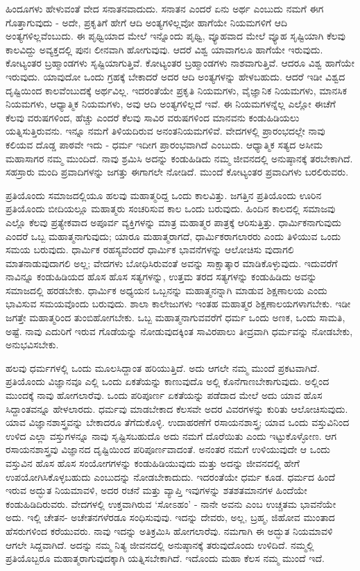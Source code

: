 ಹಿಂದೂಗಳು ಹೇಳುವಂತೆ ವೇದ ಸನಾತನವಾದುದು. ಸನಾತನ ಎಂದರೆ ಏನು ಅರ್ಥ ಎಂಬುದು ನಮಗೆ ಈಗ ಗೊತ್ತಾಗುವುದು - ಅದೇ, ಪ್ರಕೃತಿಗೆ ಹೇಗೆ ಆದಿ ಅಂತ್ಯಗಳಿಲ್ಲವೋ ಹಾಗೆಯೇ ನಿಯಮಗಳಿಗೆ ಆದಿ ಅಂತ್ಯಗಳಿಲ್ಲವೆಂಬುದು. ಈ ಪೃಥ್ವಿಯಾದ ಮೇಲೆ ಇನ್ನೊಂದು ಪೃಥ್ವಿ, ವ್ಯೂಹವಾದ ಮೇಲೆ ವ್ಯೂಹ ಸೃಷ್ಟಿಯಾಗಿ ಕೆಲವು ಕಾಲವಿದ್ದು ಅವ್ಯಕ್ತದಲ್ಲಿ ಪುನಃ ಲೀನವಾಗಿ ಹೋಗುವುವು. ಆದರೆ ವಿಶ್ವ ಯಾವಾಗಲೂ ಹಾಗೆಯೇ ಇರುವುದು. ಕೋಟ್ಯಂತರ ಬ್ರಹ್ಮಾಂಡಗಳು ಸೃಷ್ಟಿಯಾಗುತ್ತಿವೆ. ಕೋಟ್ಯಂತರ ಬ್ರಹ್ಮಾಂಡಗಳು ನಾಶವಾಗುತ್ತಿವೆ. ಆದರೂ ವಿಶ್ವ ಹಾಗೆಯೇ ಇರುವುದು. ಯಾವುದೋ ಒಂದು ಗ್ರಹಕ್ಕೆ ಬೇಕಾದರೆ ಅದರ ಆದಿ ಅಂತ್ಯಗಳನ್ನು ಹೇಳಬಹುದು. ಆದರೆ ಇಡೀ ವಿಶ್ವದ ದೃಷ್ಟಿಯಿಂದ ಕಾಲವೆಂಬುದಕ್ಕೆ ಅರ್ಥವಿಲ್ಲ. ಇದರಂತೆಯೇ ಪ್ರಕೃತಿ ನಿಯಮಗಳು, ವೈಜ್ಞಾನಿಕ ನಿಯಮಗಳು, ಮಾನಸಿಕ ನಿಯಮಗಳು, ಆಧ್ಯಾತ್ಮಿಕ ನಿಯಮಗಳು, ಅವು ಆದಿ ಅಂತ್ಯಗಳಿಲ್ಲದೆ ಇವೆ. ಈ ನಿಯಮಗಳನ್ನೆಲ್ಲ ಎಲ್ಲೋ ಈಚೆಗೆ ಕೆಲವು ವರುಷಗಳಿಂದ, ಹೆಚ್ಚು ಎಂದರೆ ಕೆಲವು ಸಾವಿರ ವರುಷಗಳಿಂದ ಮಾನವನು ಕಂಡುಹಿಡಿಯಲು ಯತ್ನಿಸುತ್ತಿರುವನು. ಇನ್ನೂ ನಮಗೆ ತಿಳಿಯದಿರುವ ಅನಂತನಿಯಮಗಳಿವೆ. ವೇದಗಳಲ್ಲಿ ಪ್ರಾರಂಭದಲ್ಲೇ ನಾವು ಕಲಿಯವ ದೊಡ್ಡ ಪಾಠವೇ ಇದು - ಧರ್ಮ ಇದೀಗ ಪ್ರಾರಂಭವಾಗಿದೆ ಎಂಬುದು. ಆಧ್ಯಾತ್ಮಿಕ ಸತ್ಯದ ಅಸೀಮ ಮಹಾಸಾಗರ ನಮ್ಮ ಮುಂದಿದೆ. ನಾವು ಶ್ರಮಿಸಿ ಅದನ್ನು ಕಂಡುಹಿಡಿದು ನಮ್ಮ ಜೀವನದಲ್ಲಿ ಅನುಷ್ಠಾನಕ್ಕೆ ತರಬೇಕಾಗಿದೆ. ಸಹಸ್ರಾರು ಮಂದಿ ಪ್ರವಾದಿಗಳನ್ನು ಜಗತ್ತು ಈಗಾಗಲೇ ನೋಡಿದೆ. ಮುಂದೆ ಕೋಟ್ಯಂತರ ಪ್ರವಾದಿಗಳು ಬರಲಿರುವರು.

ಪ್ರತಿಯೊಂದು ಸಮಾಜದಲ್ಲಿಯೂ ಹಲವು ಮಹಾತ್ಮರಿದ್ದ ಒಂದು ಕಾಲವಿತ್ತು. ಜಗತ್ತಿನ ಪ್ರತಿಯೊಂದು ಊರಿನ ಪ್ರತಿಯೊಂದು ಬೀದಿಯಲ್ಲೂ ಮಹಾತ್ಮರು ಸಂಚರಿಸುವ ಕಾಲ ಒಂದು ಬರುವುದು. ಹಿಂದಿನ ಕಾಲದಲ್ಲಿ ಸಮಾಜವು ಎಲ್ಲೊ ಕೆಲವು ಪ್ರತ್ಯೇಕವಾದ ಅಪೂರ್ವ ವ್ಯಕ್ತಿಗಳನ್ನು ಮಾತ್ರ ಮಹಾತ್ಮರ ಪಾತ್ರಕ್ಕೆ ಆರಿಸುತ್ತಿತ್ತು. ಧಾರ್ಮಿಕನಾಗುವುದು ಎಂದರೆ ಒಬ್ಬ ಮಹಾತ್ಮನಾಗುವುದು; ಯಾರೂ ಮಹಾತ್ಮರಾಗದೆ, ಧಾರ್ಮಿಕರಾಗಲಾರರು ಎಂದು ತಿಳಿಯುವ ಒಂದು ಸಮಯ ಬರುವುದು. ಧಾರ್ಮಿಕ ರಹಸ್ಯವೆಂದರೆ ಧಾರ್ಮಿಕ ಭಾವನೆಗಳನ್ನು ಆಲೋಚಿಸು ವುದಾಗಲಿ ಮಾತನಾಡುವುದಾಗಲಿ ಅಲ್ಲ; ವೇದಗಳು ಬೋಧಿಸಿರುವಂತೆ ಅವನ್ನು ಸಾಕ್ಷಾತ್ಕಾರ ಮಾಡಿಕೊಳ್ಳುವುದು. ಇದುವರೆಗೆ ನಾವಿನ್ನೂ ಕಂಡುಹಿಡಿಯದ ಹೊಸ ಹೊಸ ಸತ್ಯಗಳನ್ನು, ಉತ್ತಮ ತರದ ಸತ್ಯಗಳನ್ನು ಕಂಡುಹಿಡಿದು ಅವನ್ನು ಸಮಾಜದಲ್ಲಿ ಹರಡಬೇಕು. ಧಾರ್ಮಿಕ ಅಧ್ಯಯನ ಒಬ್ಬನನ್ನು ಮಹಾತ್ಮನನ್ನಾಗಿ ಮಾಡುವ ಶಿಕ್ಷಣಾಲಯ ಎಂದು ಭಾವಿಸುವ ಸಮಯವೊಂದು ಬರುವುದು. ಶಾಲಾ ಕಾಲೇಜುಗಳು ಇಂತಹ ಮಹಾತ್ಮರ ಶಿಕ್ಷಣಾಲಯಗಳಾಗಬೇಕು. ಇಡೀ ಜಗತ್ತೇ ಮಹಾತ್ಮರಿಂದ ತುಂಬಿಹೋಗಬೇಕು. ಒಬ್ಬ ಮಹಾತ್ಮನಾಗುವವರೆಗೆ ಧರ್ಮ ಒಂದು ಅಣಕ, ಒಂದು ಸಾಮತಿ, ಅಷ್ಟೆ. ನಾವು ಎದುರಿಗೆ ಇರುವ ಗೊಡೆಯನ್ನು ನೋಡುವುದಕ್ಕಿಂತ ಸಾವಿರಪಾಲು ತೀವ್ರವಾಗಿ ಧರ್ಮವನ್ನು ನೋಡಬೇಕು, ಅನುಭವಿಸಬೇಕು.

ಹಲವು ಧರ್ಮಗಳಲ್ಲಿ ಒಂದು ಮೂಲಸಿದ್ದಾಂತ ಹರಿಯುತ್ತಿದೆ. ಅದು ಆಗಲೇ ನಮ್ಮ ಮುಂದೆ ಪ್ರಕಟವಾಗಿದೆ. ಪ್ರತಿಯೊಂದು ವಿಜ್ಞಾನವೂ ಎಲ್ಲಿ ಒಂದು ಏಕತೆಯನ್ನು ಕಾಣುವುದೊ ಅಲ್ಲಿ ಕೊನೆಗಾಣಬೇಕಾಗುವುದು. ಅಲ್ಲಿಂದ ಮುಂದಕ್ಕೆ ನಾವು ಹೋಗಲಾರೆವು. ಒಂದು ಪರಿಪೂರ್ಣ ಏಕತೆಯನ್ನು ಪಡೆದಾದ ಮೇಲೆ ಅದು ಯಾವ ಹೊಸ ಸಿದ್ದಾಂತವನ್ನೂ ಹೇಳಲಾರದು. ಧರ್ಮವು ಮಾಡಬೇಕಾದ ಕೆಲಸವೇ ಅದರ ವಿವರಗಳನ್ನು ಕುರಿತು ಆಲೋಚಿಸುವುದು. ಯಾವ ವಿಜ್ಞಾನಶಾಸ್ತ್ರವನ್ನು ಬೇಕಾದರೂ ತೆಗೆದುಕೊಳ್ಳಿ. ಉದಾಹರಣೆಗೆ ರಸಾಯನಶಾಸ್ತ್ರ; ಯಾವ ಒಂದು ವಸ್ತುವಿನಿಂದ ಉಳಿದ ಎಲ್ಲಾ ವಸ್ತುಗಳನ್ನೂ ನಾವು ಸೃಷ್ಟಿಸಬಹುದೊ ಅದು ನಮಗೆ ದೊರೆಯಿತು ಎಂದು ಇಟ್ಟುಕೊಳ್ಳೋಣ. ಆಗ ರಸಾಯನಶಾಸ್ತ್ರವು ವಿಜ್ಞಾನದ ದೃಷ್ಟಿಯಿಂದ ಪರಿಪೂರ್ಣವಾದಂತೆ. ಅನಂತರ ನಮಗೆ ಉಳಿಯುವುದೇ ಆ ಒಂದು ವಸ್ತುವಿನ ಹೊಸ ಹೊಸ ಸಂಯೋಗಗಳನ್ನು ಕಂಡುಹಿಡಿಯುವುದು ಮತ್ತು ಅದನ್ನು ಜೀವನದಲ್ಲಿ ಹೇಗೆ ಉಪಯೋಗಿಸಿಕೊಳ್ಳಬಹುದು ಎಂಬುದನ್ನು ನೋಡಬೇಕಾದುದು. ಇದರಂತೆಯೇ ಧರ್ಮ ಕೂಡ. ಧರ್ಮದ ಹಿಂದೆ ಇರುವ ಅದ್ಭುತ ನಿಯಮಾವಳಿ, ಅದರ ರಚನೆ ಮತ್ತು ವ್ಯಾಪ್ತಿ ಇವುಗಳನ್ನು ಶತಶತಮಾನಗಳ ಹಿಂದೆಯೇ ಕಂಡುಹಿಡಿದಿರುವರು. ವೇದಗಳಲ್ಲಿ ಉಕ್ತವಾಗಿರುವ `ಸೋಽಹಂ' - ನಾನೇ ಅವನು ಎಂಬ ಉಚ್ಚತಮ ಭಾವನೆಯೇ ಅದು. ಇಲ್ಲಿ ಚೇತನ- ಅಚೇತನಗಳೆರಡೂ ಸಂಧಿಸುವುವು. ಇದನ್ನು ದೇವರು, ಅಲ್ಲ, ಬ್ರಹ್ಮ, ಜಿಹೋವ ಮುಂತಾದ ಹೆಸರುಗಳಿಂದ ಕರೆಯುವರು. ನಾವು ಇದನ್ನು ಅತಿಕ್ರಮಿಸಿ ಹೋಗಲಾರೆವು. ನಮಗಾಗಿ ಈ ಅದ್ಭುತ ನಿಯಮಾವಳಿ ಆಗಲೇ ಸಿದ್ದವಾಗಿದೆ. ಅದನ್ನು ನಮ್ಮ ನಿತ್ಯ ಜೀವನದಲ್ಲಿ ಅನುಷ್ಠಾನಕ್ಕೆ ತರುವುದೊಂದು ಉಳಿದಿದೆ. ನಮ್ಮಲ್ಲಿ ಪ್ರತಿಯೊಬ್ಬರೂ ಮಹಾತ್ಮರಾಗುವುದಕ್ಕಾಗಿ ಯತ್ನಿಸಬೇಕಾಗಿದೆ. ಇದೊಂದು ಮಹಾ ಕೆಲಸ ನಮ್ಮ ಮುಂದೆ ಇದೆ.

